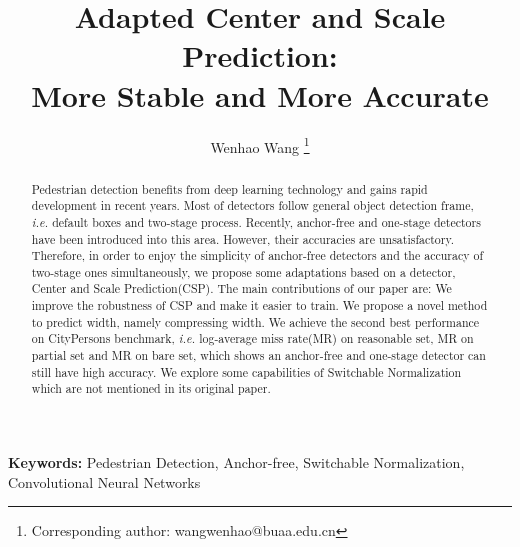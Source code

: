 \documentclass[twocolumn]{article}
\title{Adapted Center and Scale Prediction: \\More Stable and More Accurate}
\author[1]{Wenhao Wang \thanks{Corresponding author: wangwenhao@buaa.edu.cn}}
\affil[1]{School of Mathematical Sciences(SMS), Beihang University, Beijing, China}
\date{}
\providecommand{\keywords}[1]{\textbf{Keywords:} #1}
\begin{document}

\maketitle
\begin{abstract}
Pedestrian detection benefits from deep learning technology and gains rapid development in recent years. Most of detectors follow general object detection frame, \textit{i.e.} default boxes and two-stage process. Recently, anchor-free and one-stage detectors have been introduced into this area. However, their accuracies are unsatisfactory. Therefore, in order to enjoy the simplicity of anchor-free detectors and the accuracy of two-stage ones simultaneously, we propose some adaptations based on a detector, Center and Scale Prediction(CSP). The main contributions of our paper are:  We improve the robustness of CSP and make it easier to train.  We propose a novel method to predict width, namely compressing width.  We achieve the second best performance  on CityPersons benchmark, \textit{i.e.}  log-average miss rate(MR) on reasonable set,  MR on partial set and  MR on bare set, which shows an anchor-free and one-stage detector can still have high accuracy.  We explore some capabilities of Switchable Normalization which are not mentioned in its original paper.
\end{abstract}

\keywords{Pedestrian Detection, Anchor-free, Switchable Normalization, Convolutional Neural Networks}
\end{document}

